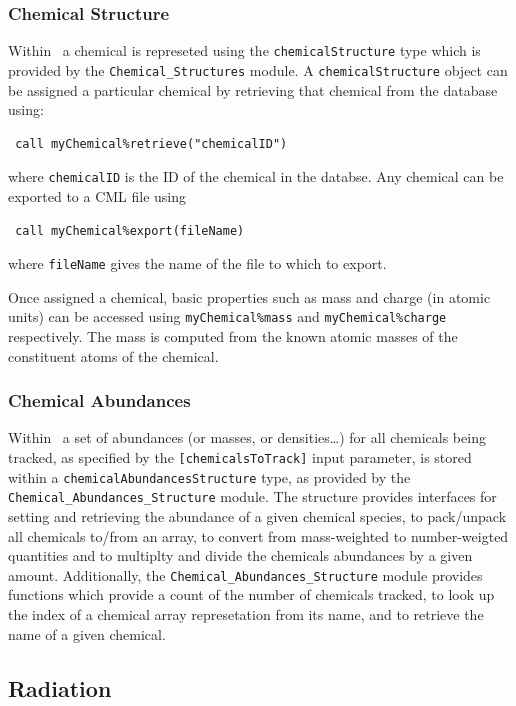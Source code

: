 \subsubsection{Chemical Structure}

Within \glc\ a chemical is represeted using the {\tt chemicalStructure} type which is provided by the {\tt Chemical\_Structures} module. A {\tt chemicalStructure} object can be assigned a particular chemical by retrieving that chemical from the database using:
\begin{verbatim}
 call myChemical%retrieve("chemicalID")
\end{verbatim}
where {\tt chemicalID} is the ID of the chemical in the databse. Any chemical can be exported to a CML file using
\begin{verbatim}
 call myChemical%export(fileName)
\end{verbatim}
where {\tt fileName} gives the name of the file to which to export.

Once assigned a chemical, basic properties such as mass and charge (in atomic units) can be accessed using {\tt myChemical\%mass} and {\tt myChemical\%charge} respectively. The mass is computed from the known atomic masses of the constituent atoms of the chemical.

\subsubsection{Chemical Abundances}

Within \glc\ a set of abundances (or masses, or densities\ldots) for all chemicals being tracked, as specified by the {\tt [chemicalsToTrack]} input parameter, is stored within a {\tt chemicalAbundancesStructure} type, as provided by the {\tt Chemical\_Abundances\_Structure} module. The structure provides interfaces for setting and retrieving the abundance of a given chemical species, to pack/unpack all chemicals to/from an array, to convert from mass-weighted to number-weigted quantities and to multiplty and divide the chemicals abundances by a given amount. Additionally, the {\tt Chemical\_Abundances\_Structure} module provides functions which provide a count of the number of chemicals tracked, to look up the index of a chemical array represetation from its name, and to retrieve the name of a given chemical.

\subsection{Radiation}\label{sec:RadiationSubsystem}


